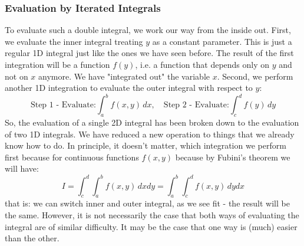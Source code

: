 \subsubsection{Evaluation by Iterated Integrals}
To evaluate such a double integral, we work our way from the inside out. First, we evaluate the inner integral treating $y$ as a constant parameter. This is just a regular 1D integral just like the ones we have seen before. The result of the first integration will be a function $f(y)$, i.e. a function that depends only on $y$ and not on $x$ anymore. We have "integrated out" the variable $x$. Second, we perform another 1D integration to evaluate the outer integral with respect to $y$:
\begin{equation}
 \text{Step 1 - Evaluate:}
 \int_a^b f(x,y) \, dx,  \quad
 \text{Step 2 - Evaluate:}
 \int_c^d f(y) \, dy
\end{equation}
So, the evaluation of a single 2D integral has been broken down to the evaluation of two 1D integrals. We have reduced a new operation to things that we already know how to do. In principle, it doesn't matter, which integration we perform first because for continuous functions $f(x,y)$ because by Fubini's theorem we will have:
\begin{equation}
 I = \int_c^d \int_a^b f(x,y) \, dx dy = \int_a^b \int_c^d f(x,y) \, dy dx 
\end{equation}
that is: we can switch inner and outer integral, as we see fit - the result will be the same. However, it is not necessarily the case that both ways of evaluating the integral are of similar difficulty. It may be the case that one way is (much) easier than the other.



